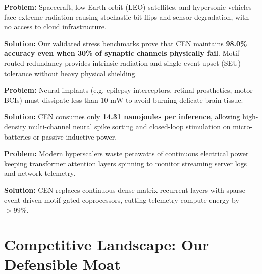 \documentclass[11pt,letterpaper]{article}
\begin{document}
\begin{tcolorbox}[colback=white, colframe=brandblue, title=\textbf{2. Aerospace, Defense \& Satellite Computing (Radiation-Tolerant Autonomy)}]
\textbf{Problem:} Spacecraft, low-Earth orbit (LEO) satellites, and hypersonic vehicles face extreme radiation causing stochastic bit-flips and sensor degradation, with no access to cloud infrastructure.

\textbf{Solution:} Our validated stress benchmarks prove that CEN maintains \textbf{98.0\% accuracy even when 30\% of synaptic channels physically fail}. Motif-routed redundancy provides intrinsic radiation and single-event-upset (SEU) tolerance without heavy physical shielding.
\end{tcolorbox}

\begin{tcolorbox}[colback=white, colframe=brandblue, title=\textbf{3. Ultra-Low-Power Biomedical Implants (Closed-Loop BCIs \& Prosthetics)}]
\textbf{Problem:} Neural implants (e.g. epilepsy interceptors, retinal prosthetics, motor BCIs) must dissipate less than $10\text{ mW}$ to avoid burning delicate brain tissue.

\textbf{Solution:} CEN consumes only \textbf{14.31 nanojoules per inference}, allowing high-density multi-channel neural spike sorting and closed-loop stimulation on micro-batteries or passive inductive power.
\end{tcolorbox}

\begin{tcolorbox}[colback=white, colframe=brandblue, title=\textbf{4. Sustainable AI Datacenters (Event-Driven Telemetry Accelerators)}]
\textbf{Problem:} Modern hyperscalers waste petawatts of continuous electrical power keeping transformer attention layers spinning to monitor streaming server logs and network telemetry.

\textbf{Solution:} CEN replaces continuous dense matrix recurrent layers with sparse event-driven motif-gated coprocessors, cutting telemetry compute energy by $>99\%$.
\end{tcolorbox}

\section{Competitive Landscape: Our Defensible Moat}
\end{document}
